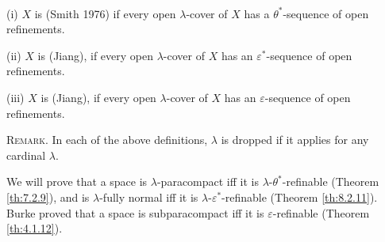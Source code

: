 \documentclass[main.tex]{subfiles}
\begin{document}
{ \label{def:1.1.9}
	\textup{(i)} $X$ is  
	\textup{(\hstretch{1.8}{[}Smith 1976\hstretch{1.8}{]}\textsuperscript{\cite{Smith1976}})} if every open $\lambda$-cover of 
	$X$ has a  $\theta^*$-sequence of open refinements.
	
	\textup{(ii)}  $X$ is 
	\textup{(\hstretch{1.8}{[}Jiang\hstretch{1.8}{]})}, if every open $\lambda$-cover of 
	$X$ has an  $\varepsilon^*$-sequence of open refinements.
	
	\textup{(iii)}  $X$ is 
	 \textup{(\hstretch{1.8}{[}Jiang\hstretch{1.8}{]})},
	if every open $\lambda$-cover of 
	$X$ has an  $\varepsilon$-sequence of open refinements.
} %

\vspace{8pt}
\textsc{Remark.} In each of the above definitions, 
$\lambda$ is dropped if it applies for any 
cardinal $\lambda$.

We will prove that a space is $\lambda$-paracompact iff it is
$\lambda$-$\theta^*$-refinable 
(Theorem \ref{th:7.2.9}), 
and is $\lambda$-fully normal iff it is $\lambda$-$\varepsilon^*$-refinable 
(Theorem \ref{th:8.2.11}). 
Burke proved that a space is subparacompact iff it is 
$\varepsilon$-refinable
(Theorem \ref{th:4.1.12}). 




 
 
\end{document}
